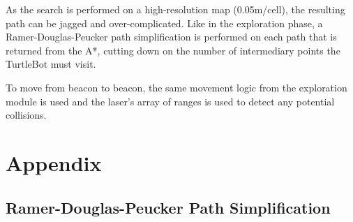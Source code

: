 \documentclass[titlepage,12pt,a4paper]{article}
\begin{document}
As the search is performed on a high-resolution map (0.05m/cell), the resulting path can be jagged and over-complicated. Like in the exploration phase, a Ramer-Douglas-Peucker path simplification is performed on each path that is returned from the A*, cutting down on the number of intermediary points the TurtleBot must visit.

To move from beacon to beacon, the same movement logic from the exploration module is used and the laser's array of ranges is used to detect any potential collisions.

\pagebreak
\section{Appendix}

\subsection{Ramer-Douglas-Peucker Path Simplification}
\end{document}
